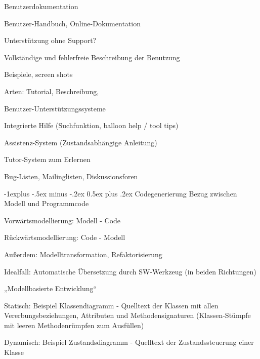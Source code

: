 \documentclass[a4paper]{article}
\makeatletter
\renewcommand{\subsection}{\@startsection{subsection}{2}{0mm}%
                                {-1explus -.5ex minus -.2ex}%
                                {0.5ex plus .2ex}%
                                {\normalfont\normalsize\bfseries}}
\makeatother
\begin{document}
\begin{multicols}{3}
  Benutzerdokumentation
  \begin{itemize*}
    \item Benutzer-Handbuch, Online-Dokumentation
    \item Unterstützung ohne Support?
    \item Vollständige und fehlerfreie Beschreibung der Benutzung
          \begin{itemize*}
            \item Beispiele, screen shots
          \end{itemize*}
    \item Arten: Tutorial, Beschreibung,
  \end{itemize*}

  Benutzer-Unterstützungssysteme
  \begin{itemize*}
    \item Integrierte Hilfe (Suchfunktion, balloon help / tool tips)
    \item Assistenz-System (Zustandsabhängige Anleitung)
    \item Tutor-System zum Erlernen
    \item Bug-Listen, Mailinglisten, Diskussionsforen
  \end{itemize*}

  \subsection{Codegenerierung}
  Bezug zwischen Modell und Programmcode
  \begin{itemize*}
    \item Vorwärtsmodellierung: Modell - Code
    \item Rückwärtsmodellierung: Code - Modell
          \begin{itemize*}
            \item Außerdem: Modelltransformation, Refaktorisierung
          \end{itemize*}
    \item Idealfall: Automatische Übersetzung durch SW-Werkzeug (in beiden Richtungen)
          \begin{itemize*}
            \item „Modellbasierte Entwicklung“
          \end{itemize*}
    \item Statisch: Beispiel Klassendiagramm - Quelltext der Klassen mit allen Vererbungsbeziehungen, Attributen und Methodensignaturen (Klassen-Stümpfe mit leeren Methodenrümpfen zum Ausfüllen)
    \item Dynamisch: Beispiel Zustandsdiagramm - Quelltext der Zustandssteuerung einer Klasse
  \end{itemize*}


\end{multicols}
\end{document}
